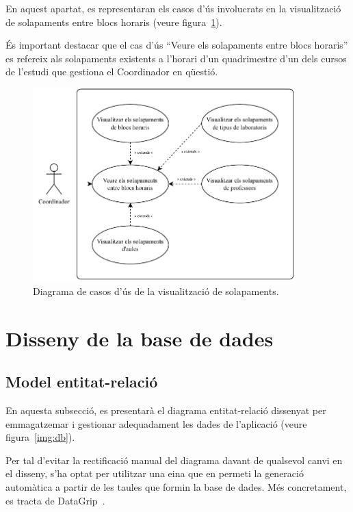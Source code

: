 \documentclass[a4paper,12pt]{ThesisStyle}
\begin{document}
En aquest apartat, es representaran els casos d'ús involucrats en la visualització de solapaments entre blocs horaris (veure figura~\ref{img:casos_us_horaris_solap}).

És important destacar que el cas d'ús ``Veure els solapaments entre blocs horaris'' es refereix als solapaments existents a l'horari d'un quadrimestre d'un dels cursos de l'estudi que gestiona el Coordinador en qüestió.

\begin{figure}[H]
  \centering
  \includegraphics[width=0.9\textwidth]{assets/use_cases/horaris/modificar/solapaments.pdf}
  \caption{\label{img:casos_us_horaris_solap}Diagrama de casos d'ús de la visualització de solapaments.}
\end{figure}

\newpage

\section{Disseny de la base de dades}
\label{sec:disseny_bdd}

\subsection{Model entitat-relació}
\label{subsec:bd_model_er}

En aquesta subsecció, es presentarà el diagrama entitat-relació dissenyat per emmagatzemar i gestionar adequadament les dades de l'aplicació (veure figura~\ref{img:db}).

Per tal d'evitar la rectificació manual del diagrama davant de qualsevol canvi en el disseny, s'ha optat per utilitzar una eina que en permeti la generació automàtica a partir de les taules que formin la base de dades. Més concretament, es tracta de DataGrip~\cite{DataGrip}.
\end{document}
